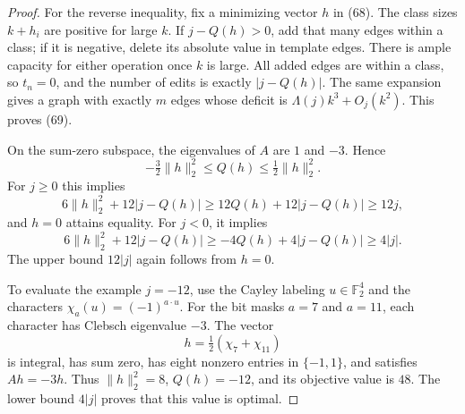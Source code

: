 \begin{proof}
For the reverse inequality, fix a minimizing vector $h$ in (68). The
class sizes $k+h_i$ are positive for large $k$. If $j-Q(h)>0$, add that
many edges within a class; if it is negative, delete its absolute value
in template edges. There is ample capacity for either operation once
$k$ is large. All added edges are within a class, so $t_n=0$, and the
number of edits is exactly $|j-Q(h)|$. The same expansion gives a graph
with exactly $m$ edges whose deficit is $\Lambda(j)k^3+O_j(k^2)$. This
proves (69).

On the sum-zero subspace, the eigenvalues of $A$ are $1$ and $-3$. Hence
\[
 -\tfrac32\lVert h\rVert_2^2\leq Q(h)\leq\tfrac12\lVert h\rVert_2^2.
\]
For $j\geq0$ this implies
\[
 6\lVert h\rVert_2^2+12|j-Q(h)|
 \geq12Q(h)+12|j-Q(h)|\geq12j,
\]
and $h=0$ attains equality. For $j<0$, it implies
\[
 6\lVert h\rVert_2^2+12|j-Q(h)|
 \geq-4Q(h)+4|j-Q(h)|\geq4|j|.
\]
The upper bound $12|j|$ again follows from $h=0$.

To evaluate the example $j=-12$, use the Cayley labeling
$u\in\mathbb F_2^4$ and the characters $\chi_a(u)=(-1)^{a\cdot u}$.
For the bit masks $a=7$ and $a=11$, each character has Clebsch eigenvalue
$-3$. The vector
\[
 h=\tfrac12(\chi_7+\chi_{11})
\]
is integral, has sum zero, has eight nonzero entries in $\{-1,1\}$, and
satisfies $Ah=-3h$. Thus $\lVert h\rVert_2^2=8$, $Q(h)=-12$, and its
objective value is $48$. The lower bound $4|j|$ proves that this value is
optimal.
\end{proof}

